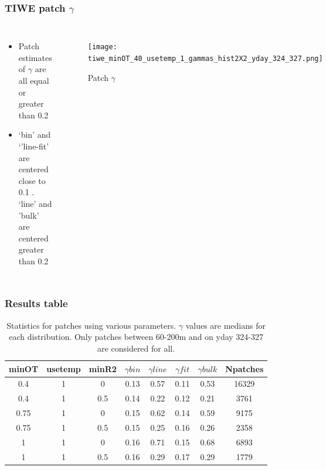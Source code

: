 \documentclass{beamer}
\begin{document}
\begin{frame}
 \frametitle{TIWE patch $\gamma$}

\begin{columns}
\begin{itemize}
\item Patch estimates of $\gamma$ are all equal or greater than 0.2
\item `bin' and `'line-fit' are centered close to 0.1 . `line' and 'bulk' are centered greater than 0.2
\end{itemize}

\begin{figure}[htbp]
\begin{center}
\texttt{[image: tiwe\_minOT\_40\_usetemp\_1\_gammas\_hist2X2\_yday\_324\_327.png]}
\caption{Patch $\gamma$}
\label{default}
\end{center}
\end{figure}

\end{columns}


\end{frame}





\begin{frame}
 \frametitle{Results table}


\begin{table}[htdp]
\caption{Statistics for patches using various parameters. $\gamma$ values are medians for each distribution. Only patches between 60-200m and on yday 324-327 are considered for all.}
\begin{center}
\begin{tabular}{|c|c|c|c|c|c|c|c|}
\hline
minOT & usetemp & minR2 & $\gamma bin$ & $\gamma line$ & $\gamma fit$ & $\gamma bulk$ & Npatches \\
\hline
0.4 & 1 & 0 & 0.13 & 0.57 & 0.11 & 0.53 & 16329 \\
\hline
0.4 & 1 & 0.5 & 0.14 & 0.22 & 0.12 & 0.21 & 3761 \\
\hline
0.75 & 1 & 0 & 0.15 & 0.62 & 0.14 & 0.59 & 9175 \\
\hline
0.75 & 1 & 0.5 & 0.15 & 0.25 & 0.16 & 0.26 & 2358 \\
\hline
1 & 1 & 0 & 0.16 & 0.71 & 0.15 & 0.68 & 6893 \\
\hline
1 & 1 & 0.5 & 0.16 & 0.29 & 0.17 & 0.29 & 1779 \\
\hline
\hline
\hline
\end{tabular}
\end{center}
\label{tab}
\end{table}%


\end{frame}
\end{document}
